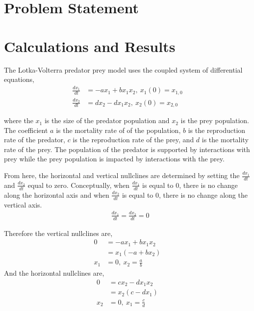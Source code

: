 \documentclass[12pt]{article}   %
\theoremstyle{definition}
\numberwithin{equation}{section}
\begin{document}
\section{Problem Statement} \label{APPM2360proj01sec01}




\newpage
\setcounter{page}{5}
\section{Calculations and Results} \label{APPM2360proj01sec01}
The Lotka-Volterra predator prey model uses the coupled system of differential equations,
\begin{align*}
%
\frac{dx_1}{dt} & = -ax_1 + bx_1x_2 ,\ x_1(0) = x_{1,0}\\
%
\frac{dx_2}{dt} & = dx_2 - dx_1x_2 ,\ x_2(0) = x_{2,0}
%
\end{align*}

where the $x_1$ is the size of the predator population and $x_2$ is the prey population. The coefficient $a$ is the mortality rate of of the population, $b$ is the reproduction rate of the predator, $c$ is the reproduction rate of the prey, and $d$ is the mortality rate of the prey. The population of the predator is supported by interactions with prey while the prey population is impacted by interactions with the prey. 

From here, the horizontal and vertical nullclines are determined by setting the $\frac{dx_1}{dt}$ and $\frac{dx_2}{dt}$ equal to zero. Conceptually, when $\frac{dx_1}{dt}$ is equal to 0, there is no change along the horizontal axis and when $\frac{dx_2}{dt}$ is equal to 0, there is no change along the vertical axis. 
\begin{align*}
& \frac{dx_1}{dt} = \frac{dx_2}{dt} = 0
\end{align*}

Therefore the vertical nullclines are,
\begin{align*}
%
0 & =  -ax_1 + bx_1x_2 \\
%  
 & = x_1(-a + bx_2) \\
%
x_1 &= 0, \ x_2 = \frac{a}{b}  
%
\end{align*}
And the horizontal nullclines are, 
\begin{align*}
%
0 & = cx_2 - dx_1x_2 \\  
%
& =  x_2(c - dx_1) \\
%
x_2 &= 0, \ x_1 = \frac{c}{d} 
\end{align*}
\end{document}
